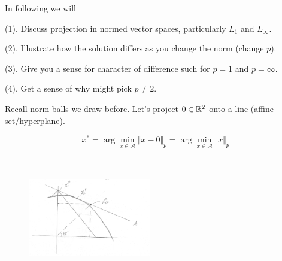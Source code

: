 \vspace{0.3cm}
In following we will

(1). Discuss projection in normed vector spaces, particularly $L_{1}$ and $L_{\infty}$.

(2). Illustrate how the solution differs as you change the norm (change $p$).

(3). Give you a sense for character of difference such for $p=1$ and $p=\infty$.

(4). Get a sense of why might pick $p\neq 2$.

\newpage
Recall norm balls we draw before. Let's project $0\in\mathbb{R}^{2}$ onto a line (affine set/hyperplane).

\begin{marginfigure}
	\centering
	\resizebox{7.5cm}{3cm}{}
	\caption{}
	\label{}
\end{marginfigure}

\begin{marginfigure}
	\centering
	\resizebox{7.5cm}{3cm}{}
	\caption{}
	\label{}
\end{marginfigure}

\begin{marginfigure}
	\centering
	\resizebox{7.5cm}{3cm}{}
	\caption{}
	\label{}
\end{marginfigure}


\begin{figure}
	\centering
	\resizebox{7.5cm}{3cm}{}
	\caption{}
	\label{}
\end{figure}

$$x^{*}=\arg\min_{x\in \mathcal{A}} \Vert x-0\Vert_{p}=\arg\min_{x\in \mathcal{A}} \Vert x\Vert_{p}$$


\begin{figure}
	\centering
	\includegraphics[width=2.1in,height=2.1in]{figures/ch02/p43.jpg}
\end{figure}


